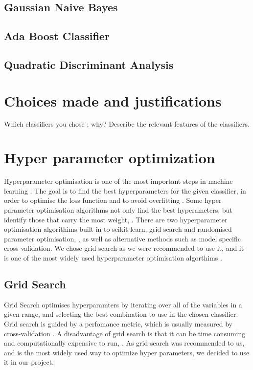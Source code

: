 \documentclass{article}
\begin{document}
	\subsection{Gaussian Naive Bayes}
	
	\subsection{Ada Boost Classifier}
	
	\subsection{Quadratic Discriminant Analysis}

\section{Choices made and justifications}
	Which classifiers you chose ; why?  
	Describe the relevant features of the classifiers.

\newpage
\section{Hyper parameter optimization}

	Hyperparameter optimisation is one of the most important steps in machine learning \cite{bardenet}. The goal is to find the best hyperparameters for the given classifier, in order to optimise the loss function and to avoid overfitting \cite{Bergstra}. Some hyper parameter optimisation algorithms not only find the best hyperameters, but identify those that carry the most weight, \cite{Bergstra}.
	There are two hyperparameter optimisation algorithims built in to scikit-learn, grid search and randomised parameter optimisation, \cite{gridsearch}, as well as alternative methods such as model specific cross validation.  We chose grid search as we were recommended to use it, and it is one of the most widely used hyperparameter optimisation algorthims \cite{HyperparameterOptimisationWiki}.  
	
	\subsection{Grid Search}
	
		Grid Search optimises hyperparamters by iterating over all of the variables in a given range, and selecting the best combination to use in the chosen classifier. Grid search is guided by a perfomance metric, which is usually measured by cross-validation \cite{HyperparameterOptimisationWiki}. A disadvantage of grid search is that it can be time consuming and computationally expensive to run, \cite{HyperparameterOptimisationWiki}.
		As grid search was recommended to us, and is the most widely used way to optimize hyper parameters, we decided to use it in our project.
		
\end{document}
